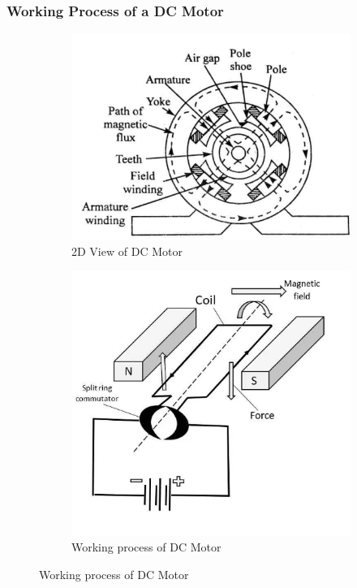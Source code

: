 \documentclass[a4paper,12pt]{article}
\begin{document}
	 \subsubsection{Working Process of a DC Motor}
	 \begin{figure}[h]
	 	\centering
	 	
	 	\begin{subfigure}[t]{0.49\textwidth}
	 		\centering
	 		\includegraphics[width=1\textwidth , height=.25\textheight]{Images/2D VIEW}
	 		\caption{2D View of DC Motor}
	 		\label{fig:3-a}
	 	\end{subfigure}
	 	\hfill
	 	\begin{subfigure}[t]{0.49\textwidth}
	 		\centering
	 		\includegraphics[width=1\textwidth, height=0.25\textheight]{Images/working proocess DC MOTOR}
	 		\caption{Working process of DC Motor}
	 		\label{fig:3-b}
	 	\end{subfigure}
	 	\caption{ Working process of DC Motor}
	 	\label{fig:3}
	 \end{figure}
	 
\end{document}
